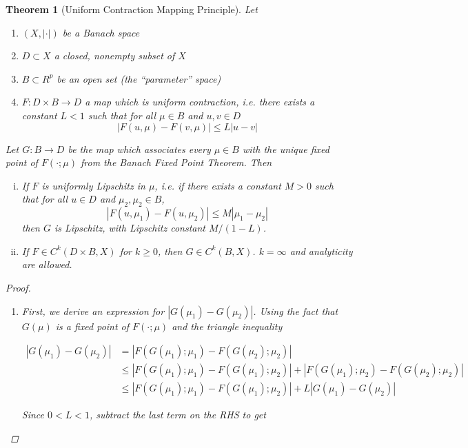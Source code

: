 \documentclass{article}
\newtheorem{theorem}{Theorem}[section]
\begin{document}
\begin{theorem}[Uniform Contraction Mapping Principle]
Let 
\begin{enumerate}
\item $(X, |\cdot|)$ be a Banach space
\item $D \subset X$ a closed, nonempty subset of $X$
\item $B \subset R^p$ be an open set (the ``parameter'' space)
\item $F: D \times B \rightarrow D$ a map which is \emph{uniform contraction}, i.e. there exists a constant $L < 1$ such that for all $\mu \in B$ and $u, v \in D$
\begin{equation}
|F(u, \mu) - F(v, \mu)| \leq L|u - v|
\end{equation}
\end{enumerate}

Let $G: B \rightarrow D$ be the map which associates every $\mu \in B$ with the unique fixed point of $F(\cdot; \mu)$ from the Banach Fixed Point Theorem. Then

\begin{enumerate}[(i)]
\item If $F$ is uniformly Lipschitz in $\mu$, i.e. if there exists a constant $M > 0$ such that for all $u \in D$ and $\mu_2, \mu_2 \in B$, 
\[
|F(u, \mu_1) - F(u, \mu_2)| \leq M |\mu_1 - \mu_2|
\]
then $G$ is Lipschitz, with Lipschitz constant $M / (1 - L)$.
\item If $F \in C^k(D \times B, X)$ for $k \geq 0$, then $G \in C^k(B, X)$. $k = \infty$ and analyticity are allowed.
\end{enumerate}
\begin{proof}

\begin{enumerate}
\item First, we derive an expression for $|G(\mu_1) - G(\mu_2)|$. Using the fact that $G(\mu)$ is a fixed point of $F(\cdot; \mu)$ and the triangle inequality

\begin{align*}
|G(\mu_1) - G(\mu_2)| &= |F( G(\mu_1); \mu_1) - F(G(\mu_2); \mu_2)| \\
&\leq |F( G(\mu_1); \mu_1) - F(G(\mu_1); \mu_2)| + |F( G(\mu_1); \mu_2) - F(G(\mu_2); \mu_2)| \\
&\leq |F( G(\mu_1); \mu_1) - F(G(\mu_1); \mu_2)| + L |G(\mu_1) - G(\mu_2)|
\end{align*}

Since $0 < L < 1$, subtract the last term on the RHS to get


\end{enumerate}
\end{proof}
\end{theorem}
\end{document}
